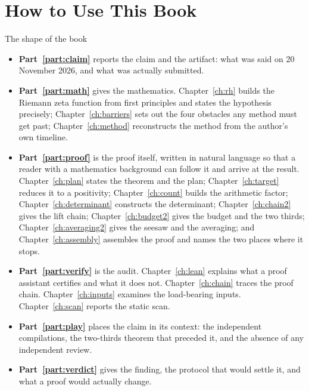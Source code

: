 \chapter*{How to Use This Book}

\thispagestyle{plain}

\begin{takeaway}{The shape of the book}
\begin{itemize}
\item \textbf{Part~\ref{part:claim}} reports the claim and the artifact: what was said on
20 November 2026, and what was actually submitted.
\item \textbf{Part~\ref{part:math}} gives the mathematics. Chapter~\ref{ch:rh} builds the Riemann
zeta function from first principles and states the hypothesis precisely;
Chapter~\ref{ch:barriers} sets out the four obstacles any method must get past; Chapter~\ref{ch:method}
reconstructs the method from the author's own timeline.
\item \textbf{Part~\ref{part:proof}} is the proof itself, written in natural
language so that a reader with a mathematics background can follow it and
arrive at the result. Chapter~\ref{ch:plan} states the theorem and the plan;
Chapter~\ref{ch:target} reduces it to a positivity; Chapter~\ref{ch:count}
builds the arithmetic factor; Chapter~\ref{ch:determinant} constructs the
determinant; Chapter~\ref{ch:chain2} gives the lift chain; Chapter~\ref{ch:budget2}
gives the budget and the two thirds; Chapter~\ref{ch:averaging2} gives the
seesaw and the averaging; and Chapter~\ref{ch:assembly} assembles the proof and
names the two places where it stops.
\item \textbf{Part~\ref{part:verify}} is the audit. Chapter~\ref{ch:lean} explains what a proof assistant
certifies and what it does not. Chapter~\ref{ch:chain} traces the proof chain. Chapter~\ref{ch:inputs}
examines the load-bearing inputs. Chapter~\ref{ch:scan} reports the static scan.
\item \textbf{Part~\ref{part:play}} places the claim in its context: the independent
compilations, the two-thirds theorem that preceded it, and the absence of any
independent review.
\item \textbf{Part~\ref{part:verdict}} gives the finding, the protocol that would settle it, and
what a proof would actually change.
\end{itemize}
\end{takeaway}


